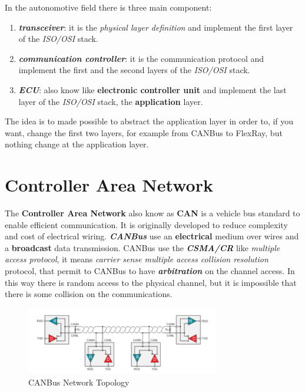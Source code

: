 In the autonomotive field there is three main component:
\begin{enumerate}[nosep]
    \item \textbf{\textit{transceiver}}: it is the \textit{physical layer definition} and implement the first layer of the \textit{ISO/OSI} stack.
    \item \textbf{\textit{communication controller}}: it is the communication protocol and implement the first and the second layers of the \textit{ISO/OSI} stack.
    \item \textbf{\textit{ECU}}: also know like \textbf{electronic controller unit} and implement the last layer of the \textit{ISO/OSI} stack, the \textbf{application} layer.
\end{enumerate}
The idea is to made possible to abstract the application layer in order to, if you want, change the first two layers, for example from CANBus to FlexRay, but nothing change at the application layer.

\section{Controller Area Network}
The \textbf{Controller Area Network} also know as \textbf{CAN} is a vehicle bus standard to enable efficient communication. It is originally developed to reduce complexity and cost of electrical wiring. \textbf{\textit{CANBus}} use an \textbf{electrical} medium over wires and a \textbf{broadcast} data transmission. CANBus use the \textbf{\textit{CSMA/CR}} like \textit{multiple access protocol}, it means \textit{carrier sense multiple access collision resolution} protocol, that permit to CANBus to have \textbf{\textit{arbitration}} on the channel access. In this way there is random access to the physical channel, but it is impossible that there is some collision on the communications.
\begin{figure}[h]
    \centering
    \label{img:canbus_1}
    \includegraphics[width=0.75\textwidth]{img/canbus_1}
    \caption{CANBus Network Topology}
\end{figure}

